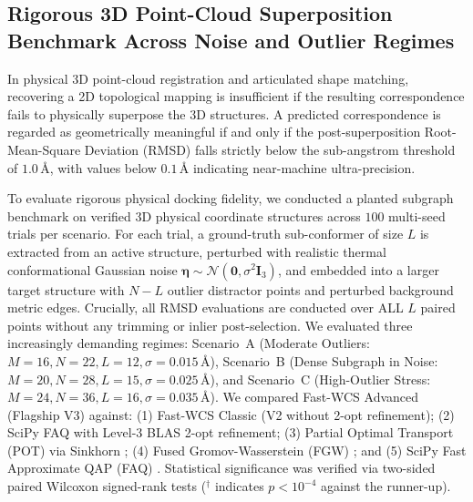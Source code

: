 \documentclass[conference]{IEEEtran}
\begin{document}
\subsection{Rigorous 3D Point-Cloud Superposition Benchmark Across Noise and Outlier Regimes}
\label{subsec:3d_conformer_benchmark}

In physical 3D point-cloud registration and articulated shape matching, recovering a 2D topological mapping is insufficient if the resulting correspondence fails to physically superpose the 3D structures. A predicted correspondence is regarded as geometrically meaningful if and only if the post-superposition Root-Mean-Square Deviation (RMSD) falls strictly below the sub-angstrom threshold of $1.0\,\text{\AA}$, with values below $0.1\,\text{\AA}$ indicating near-machine ultra-precision.

To evaluate rigorous physical docking fidelity, we conducted a planted subgraph benchmark on verified 3D physical coordinate structures across $100$ multi-seed trials per scenario. For each trial, a ground-truth sub-conformer of size $L$ is extracted from an active structure, perturbed with realistic thermal conformational Gaussian noise $\boldsymbol{\eta} \sim \mathcal{N}(\mathbf{0}, \sigma^2 \mathbf{I}_3)$, and embedded into a larger target structure with $N - L$ outlier distractor points and perturbed background metric edges. Crucially, all RMSD evaluations are conducted over ALL $L$ paired points without any trimming or inlier post-selection. We evaluated three increasingly demanding regimes: Scenario~A (Moderate Outliers: $M=16, N=22, L=12, \sigma=0.015\,\text{\AA}$), Scenario~B (Dense Subgraph in Noise: $M=20, N=28, L=15, \sigma=0.025\,\text{\AA}$), and Scenario~C (High-Outlier Stress: $M=24, N=36, L=16, \sigma=0.035\,\text{\AA}$). We compared Fast-WCS Advanced (Flagship V3) against: (1) Fast-WCS Classic (V2 without 2-opt refinement); (2) SciPy FAQ with Level-3 BLAS 2-opt refinement; (3) Partial Optimal Transport (POT) via Sinkhorn \cite{peyre2019computational}; (4) Fused Gromov-Wasserstein (FGW) \cite{titouan2019optimal}; and (5) SciPy Fast Approximate QAP (FAQ) \cite{vogelstein2015fast}. Statistical significance was verified via two-sided paired Wilcoxon signed-rank tests ($^\dagger$ indicates $p < 10^{-4}$ against the runner-up).
\end{document}

